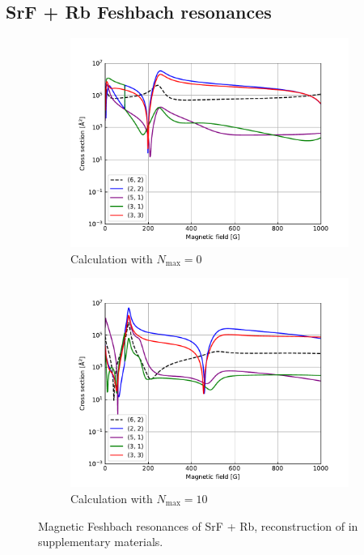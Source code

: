 \documentclass[a4paper]{article}
\begin{document}
\subsection{SrF + Rb Feshbach resonances}
    \begin{figure}[H]
        \centering
        \begin{subfigure}{.48\textwidth}
            \centering
            \includegraphics[width = 1\columnwidth]{SrF_Rb_scatterings_n_max_0.pdf}
            \caption{Calculation with $N_\text{max} = 0$}
        \end{subfigure}
        \begin{subfigure}{.48\textwidth}
            \centering
            \includegraphics[width = 1\columnwidth]{SrF_Rb_scatterings_n_max_10.pdf}
            \caption{Calculation with $N_\text{max} = 10$}
    \end{subfigure}
    \label{fig:srf_rb_feshbach}
    \caption{Magnetic Feshbach resonances of SrF + Rb, 
        reconstruction of \cite{morita2024magnetic} in supplementary materials.
    }
    \end{figure}

    
    
\end{document}
